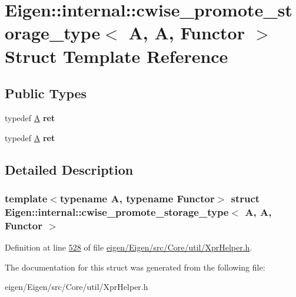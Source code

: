 \hypertarget{struct_eigen_1_1internal_1_1cwise__promote__storage__type_3_01_a_00_01_a_00_01_functor_01_4}{}\section{Eigen\+:\+:internal\+:\+:cwise\+\_\+promote\+\_\+storage\+\_\+type$<$ A, A, Functor $>$ Struct Template Reference}
\label{struct_eigen_1_1internal_1_1cwise__promote__storage__type_3_01_a_00_01_a_00_01_functor_01_4}
\subsection*{Public Types}
\begin{DoxyCompactItemize}
\item 
\mbox{\label{struct_eigen_1_1internal_1_1cwise__promote__storage__type_3_01_a_00_01_a_00_01_functor_01_4_af5bbd8a7cba07b73aa5414da82810fdd}} 
typedef \hyperlink{group___core___module_class_eigen_1_1_matrix}{A} {\bfseries ret}
\item 
\mbox{\label{struct_eigen_1_1internal_1_1cwise__promote__storage__type_3_01_a_00_01_a_00_01_functor_01_4_af5bbd8a7cba07b73aa5414da82810fdd}} 
typedef \hyperlink{group___core___module_class_eigen_1_1_matrix}{A} {\bfseries ret}
\end{DoxyCompactItemize}


\subsection{Detailed Description}
\subsubsection*{template$<$typename A, typename Functor$>$\newline
struct Eigen\+::internal\+::cwise\+\_\+promote\+\_\+storage\+\_\+type$<$ A, A, Functor $>$}



Definition at line \hyperlink{eigen_2_eigen_2src_2_core_2util_2_xpr_helper_8h_source_l00528}{528} of file \hyperlink{eigen_2_eigen_2src_2_core_2util_2_xpr_helper_8h_source}{eigen/\+Eigen/src/\+Core/util/\+Xpr\+Helper.\+h}.



The documentation for this struct was generated from the following file\+:\begin{DoxyCompactItemize}
\item 
eigen/\+Eigen/src/\+Core/util/\+Xpr\+Helper.\+h\end{DoxyCompactItemize}
